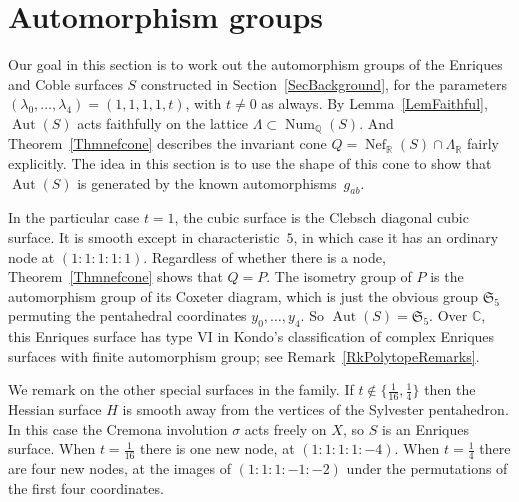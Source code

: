 \documentclass[11pt]{article}
\theoremstyle{definition}
\numberwithin{equation}{section}
\numberwithin{figure}{section}
\numberwithin{table}{section}
\newcommand*\sset{\subset}
\newcommand*\Q{\mathbb{Q}}
\newcommand*\R{\mathbb{R}}
\newcommand{\bbC}{{\mathbb{C}}}
\DeclareMathOperator{\Aut}{Aut}
\DeclareMathOperator{\Nef}{Nef}
\DeclareMathOperator{\Num}{Num}
\newcommand{\frakS}{\mathfrak{S}}
\begin{document}
\section{Automorphism groups}\label{SecAuts}

Our goal in this section is to work out the automorphism groups of the Enriques and Coble surfaces $S$ constructed in Section~\ref{SecBackground}, for the parameters $(\lambda_0,\dots,\lambda_4)=(1,1,1,1,t)$, with $t\neq0$ as always. By Lemma~\ref{LemFaithful}, $\Aut(S)$ acts faithfully on the lattice $\Lambda\sset\Num_\Q(S)$. And Theorem~\ref{Thmnefcone} describes the invariant cone $Q=\Nef_\R(S)\cap\Lambda_\R$ fairly explicitly. The idea in this section is to use the shape of this cone to show that $\Aut(S)$ is generated by the known automorphisms~$g_{ab}$.

In the particular case $t=1$, the cubic surface is the Clebsch diagonal cubic surface. It is smooth except in characteristic~$5$, in which case it has an ordinary node at $(1{:}1{:}1{:}1{:}1)$. Regardless of whether there is a node, Theorem~\ref{Thmnefcone} shows that $Q=P$. The isometry group of $P$ is the automorphism group of its Coxeter diagram, which is just the obvious group $\frakS_5$ permuting the pentahedral coordinates $y_0,\dots,y_4$. So $\Aut(S)=\frakS_5$. Over $\bbC$, this Enriques surface has type VI in Kondo's classification of complex Enriques surfaces with finite automorphism group; see Remark~\ref{RkPolytopeRemarks}.

We remark on the other special surfaces in the family. If $t\notin\{\frac1{16},\frac14\}$ then the Hessian surface $H$ is smooth away from the vertices of the Sylvester pentahedron. In this case the Cremona involution $\sigma$ acts freely on $X$, so $S$ is an Enriques surface. When $t=\frac1{16}$ there is one new node, at $(1{:}1{:}1{:}1{:}{-4})$. When $t=\frac14$ there are four new nodes, at the images of $(1{:}1{:}1{:}{-1}{:}{-2})$ under the permutations of the first four coordinates.
\end{document}
